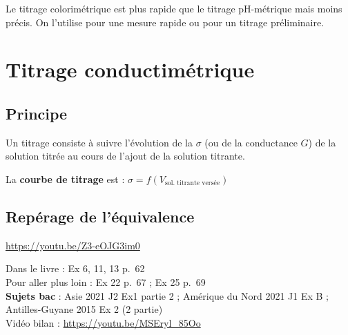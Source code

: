  Le titrage colorimétrique est plus rapide que le titrage pH-métrique mais moins précis. On l'utilise pour une mesure rapide ou pour un titrage préliminaire.

\section{Titrage conductimétrique}

\subsection{Principe}

Un titrage  consiste à suivre l'évolution de la  $\sigma$ (ou de la conductance $G$) de la solution titrée au cours de l'ajout de la solution titrante.

La \textbf{courbe de titrage} est : $\sigma = f(V_{\text{sol. titrante versée}})$


\subsection{Repérage de l'équivalence}


\url{https://youtu.be/Z3-eOJG3im0}


Dans le livre : Ex 6, 11, 13 p.~62\\
Pour aller plus loin : Ex 22 p.~67 ; Ex 25 p.~69\\
\textbf{Sujets bac} : Asie 2021 J2 Ex1 partie 2 ; Amérique du Nord 2021 J1 Ex B ; Antilles-Guyane 2015 Ex 2 (2\ieme{} partie)\\
Vidéo bilan : \url{https://youtu.be/MSEryl_85Oo}
